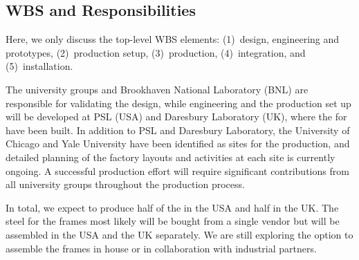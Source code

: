 

\subsection{WBS and Responsibilities}
\label{sec:fdsp-apa-org-wbs}

Here, we only discuss the top-level WBS elements: (1)~design, engineering and prototypes, (2)~production setup, (3)~production, (4)~integration, and (5)~installation.

The university groups and Brookhaven National Laboratory (BNL) are responsible for validating  the design, while engineering and the production set up will be developed at PSL %
(USA) and Daresbury Laboratory (UK), where the  for  have been built. 
In addition to PSL and Daresbury Laboratory, the University of Chicago and Yale University have been identified as sites for the production, and detailed planning of the factory layouts and activities at each site is currently ongoing. A successful production effort will require significant contributions from all university groups throughout the production process.

In total, we expect to produce half of the  in the USA and half in the UK. The steel for the frames most likely will be bought from a single vendor but will be assembled in the USA and the UK separately. We are still exploring the option to assemble the frames in house or in collaboration with industrial partners. 

